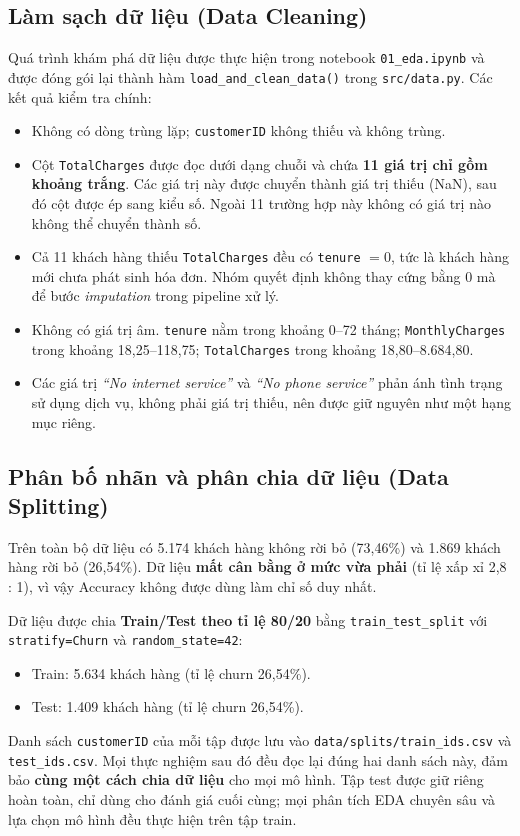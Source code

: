 \subsection{Làm sạch dữ liệu (Data Cleaning)}
Quá trình khám phá dữ liệu được thực hiện trong notebook \texttt{01\_eda.ipynb} và được đóng gói lại thành hàm \texttt{load\_and\_clean\_data()} trong \texttt{src/data.py}. Các kết quả kiểm tra chính:
\begin{itemize}
    \item Không có dòng trùng lặp; \texttt{customerID} không thiếu và không trùng.
    \item Cột \texttt{TotalCharges} được đọc dưới dạng chuỗi và chứa \textbf{11 giá trị chỉ gồm khoảng trắng}. Các giá trị này được chuyển thành giá trị thiếu (NaN), sau đó cột được ép sang kiểu số. Ngoài 11 trường hợp này không có giá trị nào không thể chuyển thành số.
    \item Cả 11 khách hàng thiếu \texttt{TotalCharges} đều có \texttt{tenure} $= 0$, tức là khách hàng mới chưa phát sinh hóa đơn. Nhóm quyết định không thay cứng bằng 0 mà để bước \textit{imputation} trong pipeline xử lý.
    \item Không có giá trị âm. \texttt{tenure} nằm trong khoảng 0--72 tháng; \texttt{MonthlyCharges} trong khoảng 18{,}25--118{,}75; \texttt{TotalCharges} trong khoảng 18{,}80--8.684{,}80.
    \item Các giá trị \textit{``No internet service''} và \textit{``No phone service''} phản ánh tình trạng sử dụng dịch vụ, không phải giá trị thiếu, nên được giữ nguyên như một hạng mục riêng.
\end{itemize}

\subsection{Phân bố nhãn và phân chia dữ liệu (Data Splitting)}
Trên toàn bộ dữ liệu có 5.174 khách hàng không rời bỏ (73{,}46\%) và 1.869 khách hàng rời bỏ (26{,}54\%). Dữ liệu \textbf{mất cân bằng ở mức vừa phải} (tỉ lệ xấp xỉ 2{,}8 : 1), vì vậy Accuracy không được dùng làm chỉ số duy nhất.

Dữ liệu được chia \textbf{Train/Test theo tỉ lệ 80/20} bằng \texttt{train\_test\_split} với \texttt{stratify=Churn} và \texttt{random\_state=42}:
\begin{itemize}
    \item Train: 5.634 khách hàng (tỉ lệ churn 26{,}54\%).
    \item Test: 1.409 khách hàng (tỉ lệ churn 26{,}54\%).
\end{itemize}
Danh sách \texttt{customerID} của mỗi tập được lưu vào \texttt{data/splits/train\_ids.csv} và \texttt{test\_ids.csv}. Mọi thực nghiệm sau đó đều đọc lại đúng hai danh sách này, đảm bảo \textbf{cùng một cách chia dữ liệu} cho mọi mô hình. Tập test được giữ riêng hoàn toàn, chỉ dùng cho đánh giá cuối cùng; mọi phân tích EDA chuyên sâu và lựa chọn mô hình đều thực hiện trên tập train.

